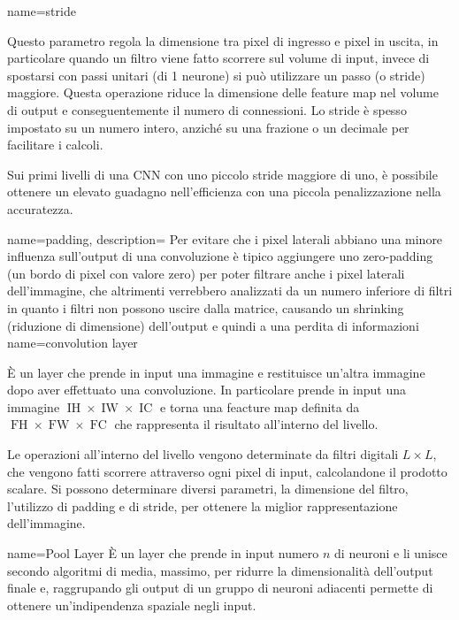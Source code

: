  {
    name=stride} {Questo parametro regola la dimensione tra pixel di ingresso e pixel in uscita, in particolare quando un filtro viene fatto scorrere sul volume di input, invece di spostarsi con passi unitari (di 1 neurone) si può utilizzare un passo (o stride) maggiore. Questa operazione riduce la dimensione delle feature map nel volume di output e conseguentemente il numero di connessioni. Lo stride è spesso impostato su un numero intero, anziché su una frazione o un decimale per facilitare i calcoli.

    Sui primi livelli di una CNN con uno piccolo stride maggiore di uno, è possibile ottenere un elevato guadagno nell'efficienza con una piccola penalizzazione nella accuratezza.}

 {
    name=padding,
    description= {Per evitare che i pixel laterali abbiano una minore influenza sull'output di una convoluzione è tipico aggiungere uno zero-padding (un bordo di pixel con valore zero) per poter filtrare anche i pixel laterali dell’immagine, che altrimenti verrebbero analizzati da un numero inferiore di filtri in quanto i filtri non possono uscire dalla matrice, causando un shrinking (riduzione di dimensione) dell’output e quindi a una perdita di informazioni}
}
{
    name={convolution layer}}{
    È un layer che prende in input una immagine e restituisce un’altra immagine dopo aver effettuato una \gls{convoluzione}. In particolare prende in input una immagine \(\operatorname{IH} \times \operatorname{IW} \times \operatorname{IC}\) e torna una feacture map definita da \(\operatorname{FH} \times \operatorname{FW} \times \operatorname{FC}\) che rappresenta il risultato all'interno del livello. 
    
    Le operazioni all’interno del livello vengono determinate da filtri digitali \(L \times L\), che vengono fatti scorrere attraverso
    ogni pixel di input, calcolandone il prodotto scalare. Si possono determinare diversi
    parametri, la dimensione del filtro, l’utilizzo di \gls{padding} e di \gls{stride}, per ottenere la miglior rappresentazione dell’immagine.} 

{
    name={Pool Layer}}{
    È un layer che prende in input numero \(n\) di neuroni e li unisce secondo algoritmi di
    media, massimo, per ridurre la dimensionalità dell’output finale e, raggrupando gli
    output di un gruppo di neuroni adiacenti permette di ottenere un’indipendenza spaziale
    negli input.}

